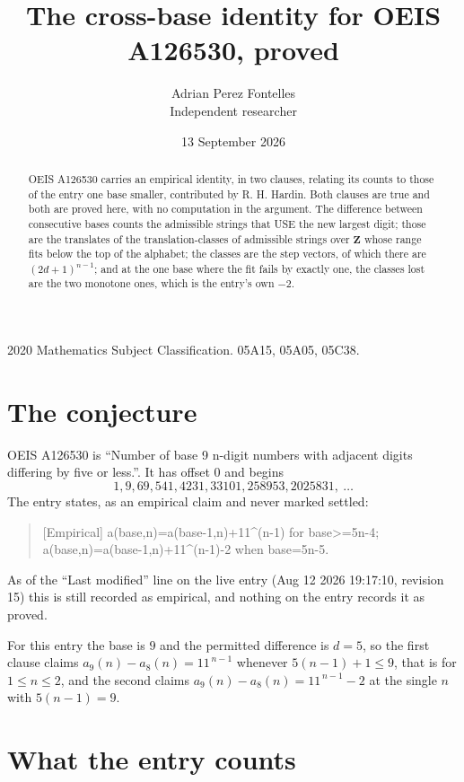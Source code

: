 \documentclass[11pt,a4paper]{article}
\title{The cross-base identity for OEIS A126530, proved}
\author{Adrian Perez Fontelles\\ \small Independent researcher}
\date{13 September 2026}
\theoremstyle{plain}
\theoremstyle{definition}
\begin{document}
\maketitle

\begin{abstract}
OEIS A126530 carries an empirical identity, in two clauses, relating its counts to those of the
entry one base smaller, contributed by R. H. Hardin. Both clauses are true and both are proved
here, with no computation in the argument. The difference between consecutive bases counts the
admissible strings that USE the new largest digit; those are the translates of the
translation-classes of admissible strings over $\mathbf{Z}$ whose range fits below the top of
the alphabet; the classes are the step vectors, of which there are $(2d+1)^{n-1}$; and at the
one base where the fit fails by exactly one, the classes lost are the two monotone ones, which
is the entry's own $-2$.
\end{abstract}

\noindent\small 2020 Mathematics Subject Classification. 05A15, 05A05, 05C38.\normalsize

\section{The conjecture}

OEIS A126530 is ``Number of base 9 n-digit numbers with adjacent digits differing by five or less.''. It has offset $0$ and begins
\[
1, 9, 69, 541, 4231, 33101, 258953, 2025831,\ \dots
\]
The entry states, as an empirical claim and never marked settled:
\begin{quote}
[Empirical] a(base,n)=a(base-1,n)+11\textasciicircum{}(n-1) for base>=5n-4; a(base,n)=a(base-1,n)+11\textasciicircum{}(n-1)-2 when base=5n-5.
\end{quote}
As of the ``Last modified'' line on the live entry (Aug 12 2026 19:17:10, revision 15)
this is still recorded as empirical, and nothing on the entry records it as proved.

For this entry the base is $9$ and the permitted difference is $d=5$, so the first clause
claims $a_{9}(n)-a_{8}(n)=11^{\,n-1}$ whenever $5(n-1)+1\le9$, that is for
$1\le n\le2$, and the second claims $a_{9}(n)-a_{8}(n)=11^{\,n-1}-2$ at the single
$n$ with $5(n-1)=9$.

\section{What the entry counts}
\end{document}
